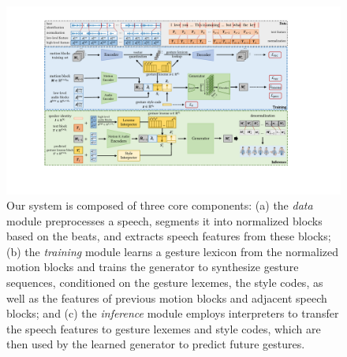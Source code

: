 \begin{figure}[t]
    \centering
    \includegraphics[width=\textwidth]{figures/overview.pdf}
    \caption{
    Our system is composed of three core components: 
    (a) the \emph{data} module preprocesses a speech, segments it into normalized blocks based on the beats, and extracts speech features from these blocks;
    (b) the \emph{training} module learns a gesture lexicon from the normalized motion blocks and trains the generator to synthesize gesture sequences, conditioned on the gesture lexemes, the style codes, as well as the features of previous motion blocks and adjacent speech blocks;
    and (c) the \emph{inference} module employs interpreters to transfer the speech features to gesture lexemes and style codes, which are then used by the learned generator to predict future gestures.
    }
    \Description{}
    \label{fig:system_overview}
\end{figure}

